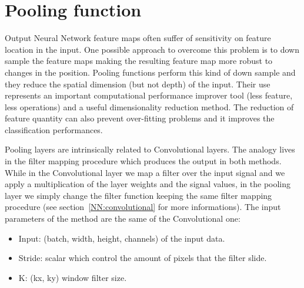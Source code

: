 \documentclass{standalone}
\begin{document}
\section[Pooling function]{Pooling function}\label{NN:pooling}

Output Neural Network feature maps often suffer of sensitivity on feature location in the input.
One possible approach to overcome this problem is to down sample the feature maps making the resulting feature map more robust to changes in the position.
Pooling functions perform this kind of down sample and they reduce the spatial dimension (but not depth) of the input.
Their use represents an important computational performance improver tool (less feature, less operations) and a useful dimensionality reduction method.
The reduction of feature quantity can also prevent over-fitting problems and it improves the classification performances.

Pooling layers are intrinsically related to Convolutional layers.
The analogy lives in the filter mapping procedure which produces the output in both methods.
While in the Convolutional layer we map a filter over the input signal and we apply a multiplication of the layer weights and the signal values, in the pooling layer we simply change the filter function keeping the same filter mapping procedure (see section~\ref{NN:convolutional} for more informations).
The input parameters of the method are the same of the Convolutional one:

\begin{itemize}

\item Input: (batch, width, height, channels) of the input data.

\item Stride: scalar which control the amount of pixels that the filter slide.

\item K: (kx, ky) window filter size.

\end{itemize}
\end{document}
